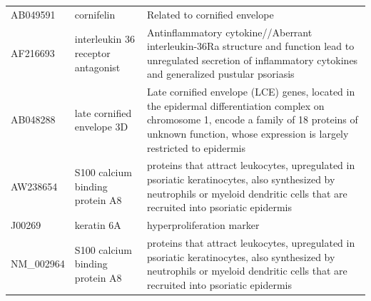\documentclass[10pt,a4paper]{article}
\begin{document}
\begin{table}[]
\begin{tabular}{l|p{4.5cm} p{8.5cm}}
		AB049591           & cornifelin                                                                                                              & Related to cornified envelope\cite{michibata2004identification}                                                                                                                                                                                                             \\
		AF216693           & interleukin 36 receptor antagonist                                                                                      & Antinflammatory cytokine//Aberrant interleukin-36Ra structure and function lead to unregulated secretion of inflammatory cytokines and generalized pustular psoriasis\cite{marrakchi2011interleukin}                                                                     \\
		AB048288           & late cornified envelope 3D                                                                                              & Late cornified envelope (LCE) genes, located in the epidermal differentiation complex on chromosome 1, encode a family of 18 proteins of unknown function, whose expression is largely restricted to epidermis\cite{niehues2017psoriasis}                             \\
		AW238654           & S100 calcium binding protein A8                                                                                         & proteins that attract leukocytes, upregulated in psoriatic keratinocytes, also synthesized by neutrophils or myeloid dendritic cells that are recruited into psoriatic epidermis\cite{roberson2010psoriasis}                                                           \\
		J00269             & keratin 6A                                                                                                              & hyperproliferation marker\cite{jiang2015biomarkers}                                                                                                                                                                                                                 \\
		NM\_002964         & S100 calcium binding protein A8                                                                                         & proteins that attract leukocytes, upregulated in psoriatic keratinocytes, also synthesized by neutrophils or myeloid dendritic cells that are recruited into psoriatic epidermis\cite{roberson2010psoriasis}                                                          \\

\end{tabular}
\end{table}
\end{document}
